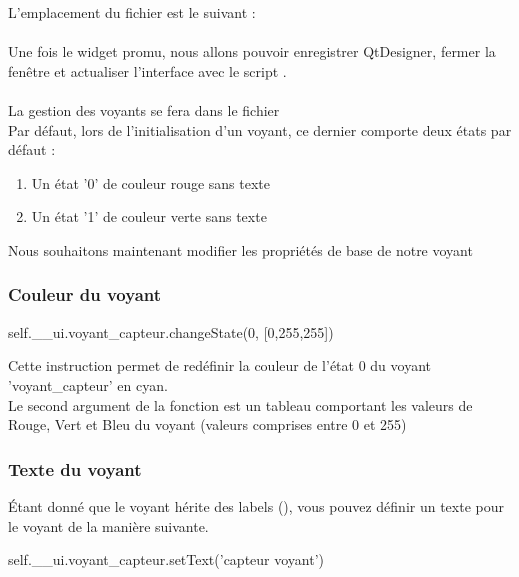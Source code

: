 L'emplacement du fichier  est le suivant : \\

 \\


Une fois le widget promu, nous allons pouvoir enregistrer QtDesigner, fermer la fenêtre et actualiser l'interface avec le script .\\ \\

La gestion des voyants se fera dans le fichier  \\


Par défaut, lors de l'initialisation d'un voyant, ce dernier comporte deux états par défaut : 


\begin{enumerate}
    \item Un état '0' de couleur rouge sans texte
    \item Un état '1' de couleur verte sans texte
\end{enumerate}

Nous souhaitons maintenant modifier les propriétés de base de notre voyant

\subsubsection{Couleur du voyant}

\begin{Python}
self.__ui.voyant_capteur.changeState(0, [0,255,255]) 
\end{Python}
Cette instruction permet de redéfinir la couleur de l'état 0 du voyant 'voyant\_capteur' en cyan. \\
Le second argument de la fonction  est un tableau comportant les valeurs de Rouge, Vert et Bleu du voyant (valeurs comprises entre 0 et 255) \\

\subsubsection{Texte du voyant}

Étant donné que le voyant hérite des labels (), vous pouvez définir un texte pour le voyant de la manière suivante.

\begin{Python}
self.__ui.voyant_capteur.setText('capteur voyant')
\end{Python}


